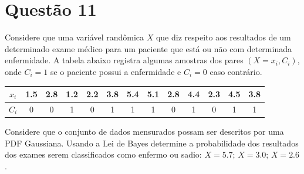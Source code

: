 \section{Questão 11}
Considere que uma variável randômica $X$ que diz respeito aos resultados de um
determinado exame médico para um paciente que está ou
não com determinada enfermidade.
A tabela abaixo registra algumas amostras dos pares $(X=x_i, C_i)$, onde $C_i=1$ se o paciente possui a enfermidade e $C_i=0$ caso contrário. 

\begin{table}[htbp]
    \centering
    \begin{tabular}{c | ccc ccc ccc ccc}
    \toprule
        $x_i$   & 1.5 & 2.8 & 1.2 & 2.2 & 3.8 & 5.4 & 5.1 & 2.8 & 4.4 & 2.3 & 4.5 & 3.8 \\
    \midrule
        $C_i$ & 0   & 0   & 1   & 0   & 1   & 1   & 1   & 0   & 1   & 0   & 1   & 1 \\
    \bottomrule
    \end{tabular}
\end{table}

Considere que o conjunto de dados mensurados possam ser descritos por uma PDF Gaussiana. 
Usando a Lei de Bayes determine a probabilidade dos resultados dos exames serem classificados como enfermo ou
sadio: $X = 5.7$; $X = 3.0$; $X = 2.6$.

\respostas


